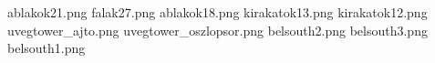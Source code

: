 ablakok21.png
falak27.png
ablakok18.png
kirakatok13.png
kirakatok12.png
uvegtower_ajto.png
uvegtower_oszlopsor.png
belsouth2.png
belsouth3.png
belsouth1.png

